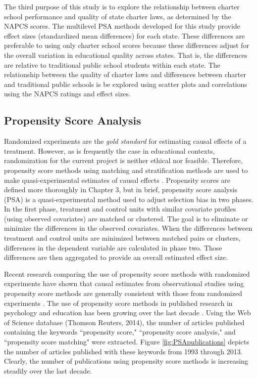 \documentclass[letterpaper,12pt]{article} %
\begin{document}
The third purpose of this study is to explore the relationship between charter school performance and quality of state charter laws, as determined by the NAPCS scores. The multilevel PSA methods developed for this study provide effect sizes (standardized mean differences) for each state. These differences are preferable to using only charter school scores because these differences adjust for the overall variation in educational quality across states. That is, the differences are relative to traditional public school students within each state. The relationship between the quality of charter laws and differences between charter and traditional public schools is be explored using scatter plots and correlations using the NAPCS ratings and effect sizes.

\subsection{Propensity Score Analysis}

Randomized experiments are the \textit{gold standard} for estimating causal effects of a treatment. However, as is frequently the case in educational contexts, randomization for the current project is neither ethical nor feasible. Therefore, propensity score methods \cite{RosenbaumRubin1983} using matching \cite{StuartRubin2008,Stuart2010} and stratification methods \cite{RaudenbushHongRowan2003} are used to make quasi-experimental estimates of causal effects \cite<see also>{SchneiderEtAl2007,StuartRubin2008}. Propensity scores are defined more thoroughly in Chapter 3, but in brief, propensity score analysis (PSA) is a quasi-experimental method used to adjust selection bias in two phases. In the first phase, treatment and control units with similar covariate profiles (using observed covariates) are matched or clustered. The goal is to eliminate or minimize the differences in the observed covariates. When the differences between treatment and control units are minimized between matched pairs or clusters, differences in the dependent variable are calculated in phase two. Those differences are then aggregated to provide an overall estimated effect size.

Recent research comparing the use of propensity score methods with randomized experiments have shown that causal estimates from observational studies using propensity score methods are generally consistent with those from randomized experiments \cite{CookShadishWong2008,ShadishClarkSteiner2008}. The use of propensity score methods in published research in psychology and education has been growing over the last decade \cite{ThoemmesKim2011}. Using the Web of Science database (Thomson Reuters, 2014), the number of articles published containing the keywords ``propensity score," ``propensity score analysis," and ``propensity score matching" were extracted. Figure \ref{fig:PSApublications} depicts the number of articles published with these keywords from 1993 through 2013. Clearly, the number of publications using propensity score methods is increasing steadily over the last decade.
\end{document}
